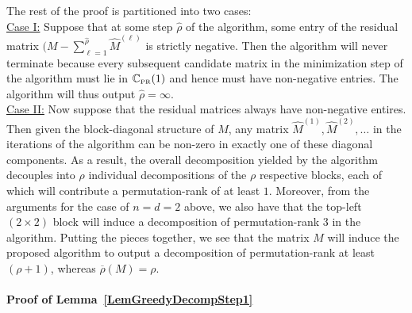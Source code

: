 \documentclass[11pt, hidelinks]{article} %
\newcommand{\numrows}{n}
\newcommand{\numcols}{d}
\newcommand{\wtmatrix}{M}
\newcommand{\wt}{\wtmatrix}
\newcommand{\matrixset}{\mathbb{C}}
\newcommand{\wthat}{\widehat{\wtmatrix}}
\newcommand{\permset}{\matrixset_{\mbox{\tiny PR}}}
\newcommand{\permone}{\permset(1)}
\newcommand{\permrank}{\rho}
\newcommand{\fnpermrank}[1]{\overline{\permrank}(#1)}
\begin{document}
The rest of the proof is partitioned into two cases:\\
\noindent \underline{Case I:} Suppose that at some step $\widehat{\permrank}$ of the algorithm, some entry of the residual matrix $(\wt - \sum_{\ell=1}^{\widehat{\permrank}} \wthat^{(\ell)}$ is strictly negative. Then  the algorithm will never terminate because every subsequent candidate matrix in the minimization step of the algorithm must lie in $\permone$ and hence must have non-negative entries. The algorithm will thus output $\widehat{\permrank} = \infty$.\\

\noindent \underline{Case II:} Now suppose that the residual matrices always have non-negative entires. Then given the block-diagonal structure of $\wt$, any matrix $\wthat^{(1)}, \wthat^{(2)},\ldots$ in the iterations of the algorithm can be
non-zero in exactly one of these diagonal components. As a result, the overall decomposition yielded
by the algorithm decouples into $\permrank$ individual decompositions
of the $\permrank$ respective blocks, each of which will contribute a
permutation-rank of at least $1$. Moreover, from the arguments for the
case of $\numrows = \numcols = 2$ above, we also have that the
top-left $(2 \times 2)$ block will induce a decomposition of
permutation-rank $3$ in the algorithm. Putting the pieces together, we
see that the matrix $\wt$ will induce the proposed algorithm to output
a decomposition of permutation-rank at least $(\permrank + 1)$,
whereas $\fnpermrank{\wt} = \permrank$.



\paragraph*{Proof of Lemma~\ref{LemGreedyDecompStep1}}
\end{document}
